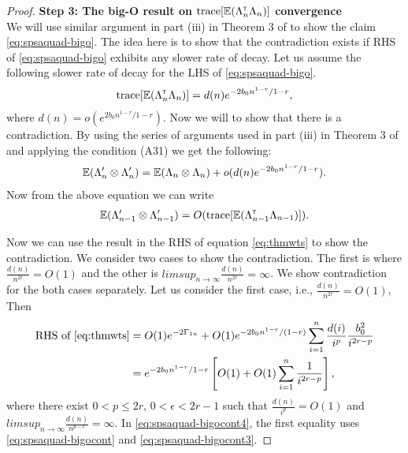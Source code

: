\begin{proof}
\noindent\textbf{Step 3: The big-O result on $\text{trace}[\mathbb{E} (\Lambda_n ^\mathsf{\scriptscriptstyle T} \Lambda_n)]$ convergence} \\
We will use similar argument in part (iii) in Theorem 3 of \cite{spall-jacobian} to show the claim \eqref{eq:spsaquad-bigo}. The idea here is to show that the contradiction exists if RHS of \eqref{eq:spsaquad-bigo} exhibits  any slower rate of decay. Let us assume the following slower rate of decay for the LHS of \eqref{eq:spsaquad-bigo}.
\begin{align}
\text{trace}[\mathbb{E} (\Lambda_n ^\mathsf{\scriptscriptstyle T} \Lambda_n)] = d(n) e^{-2b_0n^{1-r} / {1-r}},
\label{eq:spsaquad-bigocont}
\end{align}
where $d(n) = o(e^{2b_0n^{1-r} / {1-r}})$. Now we will to show that there is a contradiction. By using the series of arguments used in part (iii) in Theorem 3 of \cite{spall-jacobian} and applying the condition (A31) we get the following: 
\begin{align}
\mathbb{E} (\Lambda_{n}' \otimes \Lambda_{n}') = \mathbb{E} (\Lambda_{n} \otimes \Lambda_{n}) + o(d(n) e^{-2b_0n^{1-r} / {1-r}}).
\label{eq:spsaquad-bigocont2}
\end{align}
Now from the above equation we can write 
\begin{align}
\mathbb{E} (\Lambda_{n-1}' \otimes \Lambda_{n-1}') = O (\text{trace}[\mathbb{E} (\Lambda_{n-1} ^\mathsf{\scriptscriptstyle T} \Lambda_{n-1})]). 
\label{eq:spsaquad-bigocont3}
\end{align}

Now we can use the result in the RHS of equation \eqref{eq:thmwts} to show the contradiction. We consider two cases to show the contradiction. The first is where $\frac{d(n)}{n^{2r}} = O(1)$ and the other is $lim sup_{n \to \infty} \frac{d(n)}{n^{2r}} = \infty$. We show contradiction for the both cases separately. Let us consider the first case, i.e., $\frac{d(n)}{n^{2r}} = O(1)$, Then
\begin{align}
\text{RHS of \eqref{eq:thmwts}} &= O(1) e^{-2 \Gamma_{1n}} +  O(1) e^{-2 b_0 n^{1-r}/(1-r)} \sum_{i=1}^n \frac{d(i)}{i^{p}} \frac{b_0^2}{i^{2r-p}}\nonumber \\
&= e^{-2b_0n^{1-r} / {1-r}} \left[ O(1) + O(1) \sum_{i =1}^n \frac{1}{i^{2r-p}}\right],
\label{eq:spsaquad-bigocont4}
\end{align}
where there exist  $0 < p \le 2r$, $0 < \epsilon < 2r -1$ such that $\frac{d(n)}{i^{p}} = O(1)$ and $lim sup_{n \to \infty} \frac{d(n)}{n^{p-\epsilon}} = \infty$. In \eqref{eq:spsaquad-bigocont4}, the first equality uses \eqref{eq:spsaquad-bigocont} and \eqref{eq:spsaquad-bigocont3}.


\end{proof}
